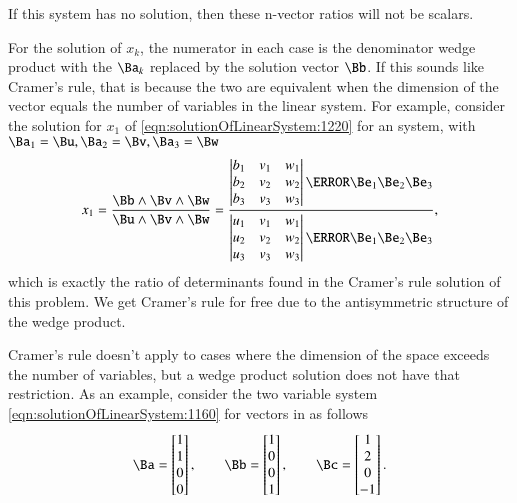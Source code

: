 If this system has no solution, then these n-vector ratios will not be scalars.

For the solution of \( x_k \), the numerator in each case is the denominator wedge product with the \( \Ba_k \) replaced by the solution vector \( \Bb \).
If this sounds like Cramer's rule, that is because the two are equivalent when the dimension of the vector equals the number of variables in the linear system.
For example, consider the solution for \( x_1 \) of \cref{eqn:solutionOfLinearSystem:1220} for an  system, with \( \Ba_1 = \Bu, \Ba_2 = \Bv, \Ba_3 = \Bw \)
\begin{equation}\label{eqn:solutionOfLinearSystem:1260}
x_1 =
\frac{ \Bb \wedge \Bv \wedge \Bw }
{ \Bu \wedge \Bv \wedge \Bw }
=
\frac{
\begin{vmatrix}
b_1 & v_1 & w_1 \\
b_2 & v_2 & w_2 \\
b_3 & v_3 & w_3 \\
\end{vmatrix}
\cancel{\Be_1 \Be_2 \Be_3}
}
{
\begin{vmatrix}
u_1 & v_1 & w_1 \\
u_2 & v_2 & w_2 \\
u_3 & v_3 & w_3 \\
\end{vmatrix}
\cancel{\Be_1 \Be_2 \Be_3}
},
\end{equation}
which is exactly the ratio of determinants found in the Cramer's rule solution of this problem.  We get Cramer's rule for free due to the antisymmetric structure of the wedge product.

Cramer's rule doesn't apply to cases where the dimension of the space exceeds the number of variables, but a wedge product solution does not have that restriction.  As an example, consider the two variable system \cref{eqn:solutionOfLinearSystem:1160} for vectors in  as follows
\begin{equation}\label{eqn:solutionOfLinearSystem:1280}
\Ba =
\begin{bmatrix}
1 \\
1 \\
0 \\
0
\end{bmatrix}, \qquad
\Bb =
\begin{bmatrix}
1 \\
0 \\
0 \\
1
\end{bmatrix}, \qquad
\Bc =
\begin{bmatrix}
1 \\
2 \\
0 \\
-1
\end{bmatrix}.
\end{equation}

